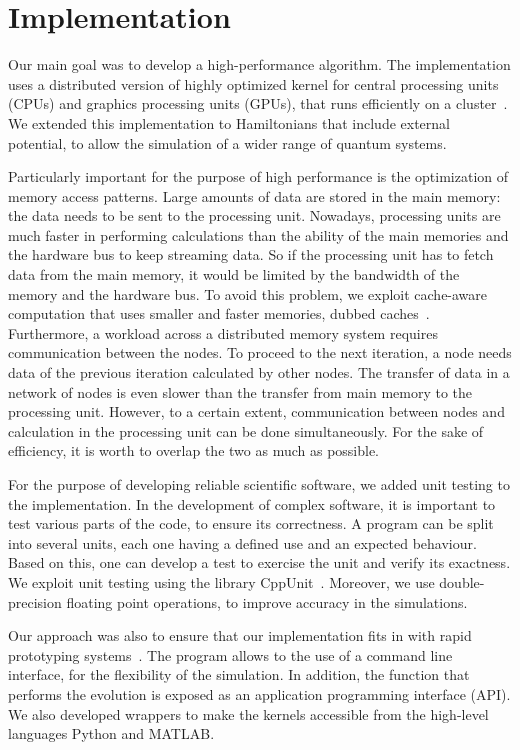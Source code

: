 \chapter{Implementation}
Our main goal was to develop a high-performance algorithm. The implementation uses a distributed version of highly optimized kernel for central processing units (CPUs) and graphics processing units (GPUs), that runs efficiently on a cluster~\citep{Wittek20131165}. We extended this implementation to Hamiltonians that include external potential, to allow the simulation of a wider range of quantum systems. 

Particularly important for the purpose of high performance is the optimization of memory access patterns. Large amounts of data are stored in the main memory: the data needs to be sent to the processing unit. Nowadays, processing units are much faster in performing calculations than the ability of the main memories and the hardware bus to keep streaming data. So if the processing unit has to fetch data from the main memory, it would be limited by the bandwidth of the memory and the hardware bus. To avoid this problem, we exploit cache-aware computation that uses smaller and faster memories, dubbed caches~\citep{Handy}. 
Furthermore, a workload across a distributed memory system requires  communication between the nodes. To proceed to the next iteration, a node needs data of the previous iteration calculated by other nodes. The transfer of data in a network of nodes is even slower than the transfer from main memory to the processing unit. However, to a certain extent, communication between nodes and calculation in the processing unit can be done simultaneously. For the sake of efficiency, it is worth to overlap the two as much as possible.

For the purpose of developing reliable scientific software, we added unit testing to the implementation. In the development of complex software, it is important to test various parts of the code, to ensure its correctness. A program can be split into several units, each one having a defined use and an expected behaviour. Based on this, one can develop a test to exercise the unit and verify its exactness. We exploit unit testing using the library CppUnit~\citep{CPPUnit}. Moreover, we use double-precision floating point operations, to improve accuracy in the simulations.

Our approach was also to ensure that our implementation fits in with rapid prototyping
systems~\citep{SmithMF}. The program allows to the use of a command line interface, for the flexibility of the simulation. In addition, the function that performs the evolution is exposed as an application programming interface (API). We also developed wrappers to make the kernels accessible from the  high-level languages Python and MATLAB.

